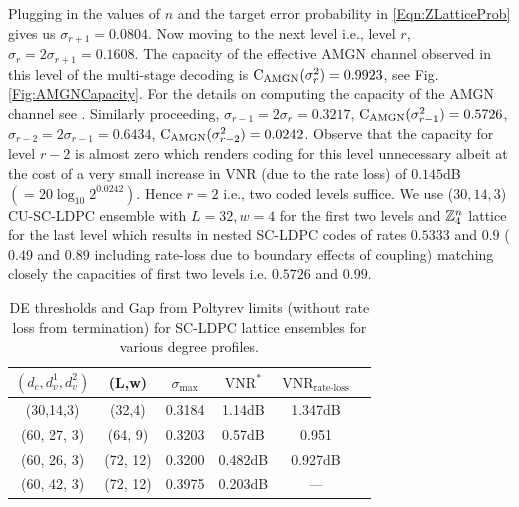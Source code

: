 \documentclass[journal,twocolumn]{IEEEtran}
\begin{document}
Plugging in the values of $n$ and the target error probability in \eqref{Eqn:ZLatticeProb} gives us $\sigma_{r+1}= 0.0804$. Now moving to the next level i.e., level $r$, $\sigma_{r}=2\sigma_{r+1}=0.1608$. The capacity of the effective AMGN channel observed in this level of the multi-stage decoding is $\text{C}_{\text{AMGN}}(\sigma^{2}_{r})=0.9923$, see Fig. \ref{Fig:AMGNCapacity}. For the details on computing the capacity of the AMGN channel see \cite{forney2000}.  Similarly proceeding, $\sigma_{r-1}=2\sigma_{r}=0.3217$, $\text{C}_{\text{AMGN}}(\sigma^{2}_{r-1})=0.5726$, $\sigma_{r-2}=2\sigma_{r-1}=0.6434$, $\text{C}_{\text{AMGN}}(\sigma^{2}_{r-2})=0.0242$. Observe that the capacity for level $r-2$ is almost zero which renders coding for this level unnecessary albeit at the cost of a very small increase in VNR (due to the rate loss) of $0.145$dB $(=20\log_{10}2^{0.0242})$. Hence $r=2$ i.e., two coded levels suffice. We use ($30,14,3$) CU-SC-LDPC ensemble with $L=32, w=4$ for the first two levels and $\mathbb{Z}_{4}^{n}$ lattice for the last level which results in nested SC-LDPC codes of rates $0.5333$ and $0.9$ ($0.49$ and $0.89$ including rate-loss due to boundary effects of coupling) matching closely the capacities of first two levels i.e. $0.5726$ and $0.99$.
\begin{table}
\centering
\caption{DE thresholds and Gap from Poltyrev limits (without rate loss from termination) for SC-LDPC lattice ensembles for various degree profiles.}
\begin{tabular}{c c c c c c}
\hline  \hline
$(d_{c},d_{v}^{1},d_{v}^{2})$ &(L,w)& $\sigma_{\text{max}}$ &$\text{VNR}^{*}$ &$\text{VNR}_{\text{rate-loss}}$\\
\hline
(30,14,3) & (32,4) & 0.3184 & 1.14dB & 1.347dB\\
(60, 27, 3)& (64, 9)  &  0.3203 & 0.57dB & 0.951\\
(60, 26, 3)& (72, 12) & 0.3200 &0.482dB & 0.927dB\\
(60, 42, 3)& (72, 12) & 0.3975 & 0.203dB &---\\
\end{tabular}
\label{Table:Thresholds}
\end{table}
\end{document}
